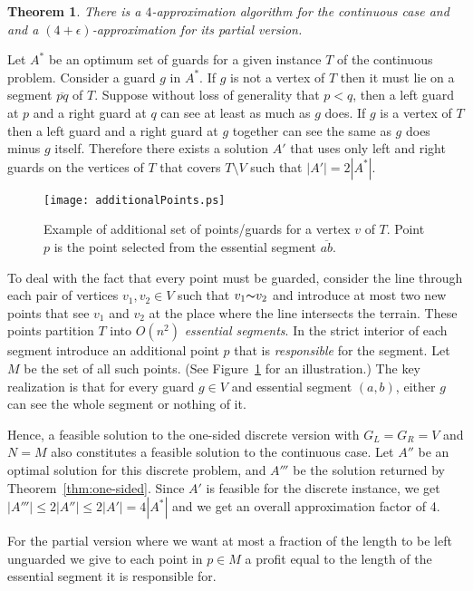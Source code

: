 \documentclass[11pt]{article}
\def\see{{\thicksim}}
\newtheorem{theorem}{Theorem}
\begin{document}
\begin{theorem} \label{thm:continuous}
  There is a $4$-approximation algorithm for the continuous case and and a $(4 +
  \epsilon)$-approximation for its partial version.
\end{theorem}

Let $A^*$ be an optimum set of guards for a given instance $T$ of the
continuous problem. Consider a guard $g$ in $A^*$. If $g$ is not a vertex
of $T$ then it must lie on a segment $\overline{pq}$ of $T$. Suppose without loss of generality that $p<q$,
then a left guard at $p$ and a right guard at $q$
can see at least as much as $g$ does. If $g$ is a vertex of $T$ then a left
guard and a right guard at $g$ together can see the same as $g$ does minus $g$
itself. Therefore there exists a solution $A'$ that uses only left and right
guards on the vertices of $T$ that covers $T \setminus V$ such
that $|A'| = 2 |A^*|$.

\begin{figure}[t]
  \centering
  \texttt{[image: additionalPoints.ps]}
  \caption{Example of additional set of points/guards for a vertex $v$ of $T$.
  Point $p$ is the point selected from the essential segment $\overline{ab}$.}
  \label{fig:additionalPoints}
\end{figure}

To deal with the fact that every point must be guarded, consider the line
through each pair of vertices $v_1,v_2 \in V$ such that $v_1\see v_2$ and
introduce at most two new points that see $v_1$ and $v_2$ at the place where
the line intersects the terrain. These points partition $T$ into $O(n^2)$
\emph{essential segments}. In the strict interior of each segment introduce an
additional point $p$ that is \emph{responsible} for the segment. Let $M$ be
the set of all such points. (See Figure~\ref{fig:additionalPoints} for an illustration.) The key realization is that for every guard $g \in V$ and essential
segment $(a,b)$, either $g$ can see the whole segment or nothing of it.

Hence, a feasible solution to the one-sided discrete version with $G_L=G_R = V$
and $N= M$ also constitutes a feasible solution to the continuous case. Let $A''$ be an optimal solution for this discrete problem, and $A'''$ be
the solution returned by Theorem~\ref{thm:one-sided}. Since $A'$ is feasible for the discrete instance, we get
$|A'''|\leq 2|A''|\leq 2|A'|= 4|A^*|$ and we get
an overall approximation factor of 4.

For the partial version where we want at most a fraction of the length to be
left unguarded we give to each point in $p \in M$ a profit equal to the length
of the essential segment it is responsible for.
\end{document}
